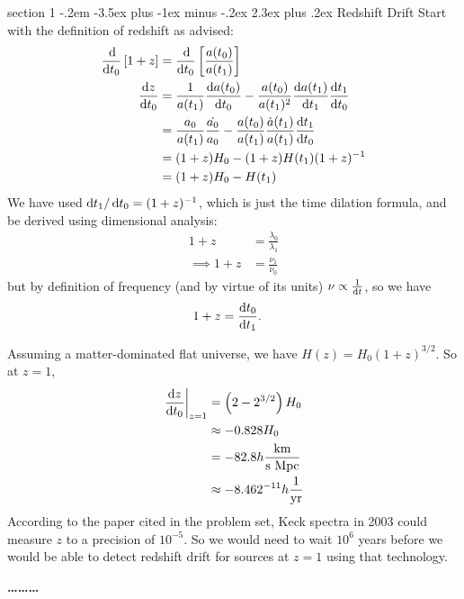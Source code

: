 \documentclass[12pt]{article}
\makeatletter
\newenvironment{problem}{\@startsection
	{section}
	{1}
	{-.2em}
	{-3.5ex plus -1ex minus -.2ex}
	{2.3ex plus .2ex}
	{\pagebreak[3]%
		\large\bf\noindent{Problem }
	}
}
{%
	\begin{center}\large\bf \ldots\ldots\ldots\end{center}}
\makeatother
\begin{document}
	\begin{problem}{Redshift Drift}
		Start with the definition of redshift as advised: \begin{align*}
			\frac{\dif}{\dif t_0}\left[ 1 + z \right] &= \frac{\dif}{\dif t_0}\left[ \frac{a(t_0)}{a(t_1)} \right]
			\\
			\frac{\dif z}{\dif t_0} &= \frac{1}{a(t_1)} \frac{\dif a(t_0)}{\dif t_0} - \frac{a(t_0)}{a(t_1)^2} \frac{\dif a(t_1)}{\dif t_1}\frac{\dif t_1}{\dif t_0}
			\\
			&= \frac{a_0}{a(t_1)} \frac{\dot{a_0}}{a_0} - \frac{a(t_0)}{a(t_1)} \frac{\dot{a}(t_1)}{a(t_1)}\frac{\dif t_1}{\dif t_0}
			\\
			&= (1+z) H_0 - (1+z)H(t_1)(1+z)^{-1}
			\\
			&= (1+z) H_0 - H(t_1)
		\end{align*} We have used $\dif t_1/\dif t_0 =(1+z)^{-1}$, which is just the time dilation formula, and be derived using dimensional analysis: \begin{align*}
			1 + z &= \frac{\lambda_0}{\lambda_1}
			\\
			\implies 1 + z &= \frac{\nu_1}{\nu_0}
		\end{align*} but by definition of frequency (and by virtue of its units) $\nu\propto \frac{1}{\dif t}$, so we have \begin{align*}
			1 + z &= \frac{\dif t_0}{\dif t_1}.
		\end{align*}
		
		Assuming a matter-dominated flat universe, we have $H(z) = H_0(1+z)^{3/2}$.  So at $z=1$, \begin{align*}
			\left.\frac{\dif z}{\dif t_0}\right\vert_{z=1} &= \left(2 - 2^{3/2}\right)H_0
			\\
			&\approx -0.828 H_0
			\\
			&= -82.8 h \frac{\text{km}}{\text{s Mpc}}
			\\
			&\approx -8.462 \time 10^{-11} h \frac{1}{\text{yr}}
		\end{align*} According to the paper cited in the problem set, Keck spectra in 2003 could measure $z$ to a precision of $10^{-5}$.  So we would need to wait $10^6$ years before we would be able to detect redshift drift for sources at $z=1$ using that technology.
		
	\end{problem}

% 
\end{document}
